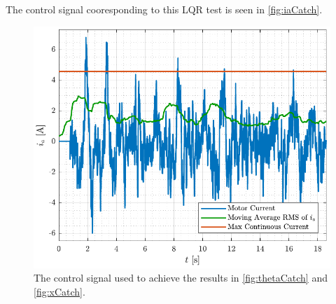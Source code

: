 The control signal cooresponding to this LQR test is seen in \autoref{fig:iaCatch}.
\begin{figure}[H]
  \includegraphics[width=.5\textwidth]{figures/iaCatch}
  \caption{The control signal used to achieve the results in \autoref{fig:thetaCatch} and \ref{fig:xCatch}.}
  \label{fig:iaCatch}
\end{figure}

